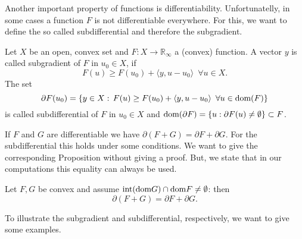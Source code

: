     Another important property of functions is differentiability. Unfortunatelly, in some cases a function $F$ is not differentiable everywhere. For this, we want to define the so called subdifferential and therefore the subgradient.

    \begin{definition} %
        \label{def:subgradient_subdifferential}

        Let $X$ be an open, convex set and $F: X \longrightarrow \mathbb{R}_{\infty}$ a (convex) function. A vector $y$ is called subgradient of $F$ in $u_{0} \in X$, if
            \begin{equation}
                F(u) \ge F(u_{0}) + \langle y, u - u_{0} \rangle \,\,\, \forall u \in X.
            \label{eq:subgradient}
            \end{equation}
        The set
            $$
                \partial F(u_{0}) = \{ y \in X: \, F(u) \ge F(u_{0}) + \langle y, u - u_{0} \rangle \,\,\, \forall u \in \textnormal{dom}(F) \}
            $$
        is called subdifferential of $F$ in $u_{0} \in X$ and $\textnormal{dom}(\partial F) = \{ u: \partial F(u) \ne \emptyset \} \subset F$.

    \end{definition}

    If $F$ and $G$ are differentiable we have $\partial(F + G) = \partial F + \partial G$. For the subdifferential this holds under some conditions. We want to give the corresponding Proposition without giving a proof. But, we state that in our computations this equality can always be used.

    \begin{proposition} %

        Let $F, G$ be convex and assume $\textnormal{int} (\textnormal{dom} G) \cap \textnormal{dom} F \ne \emptyset$: then
            $$
                \partial(F + G) = \partial F + \partial G.
            $$
    
    \end{proposition}

    To illustrate the subgradient and subdifferential, respectively, we want to give some examples.

